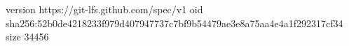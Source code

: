 version https://git-lfs.github.com/spec/v1
oid sha256:52b0de4218233f979d407947737c7bf9b54479ae3e8a75aa4e4a1f292317cf34
size 34456
